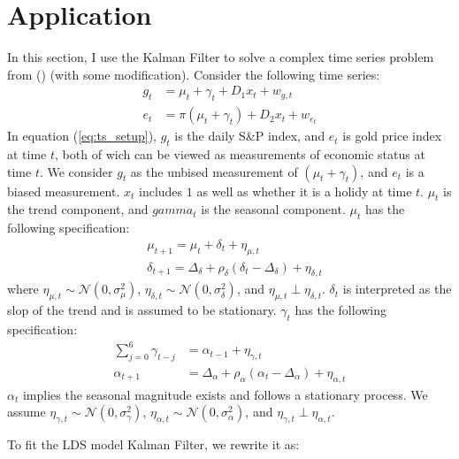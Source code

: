 \documentclass[12pt]{article}
\numberwithin{equation}{section}
\begin{document}
\section{Application} \label{sec:apply}
In this section, I use the Kalman Filter to solve a complex time series problem from (\cite{brodersen_etal_2015}) (with some modification). Consider the following time series: 
\begin{align}
    g_t &= \mu_t + \gamma_t + D_1x_t + w_{g,t} \label{eq:ts_setup} \\
    e_t &= \pi(\mu_t + \gamma_t) + D_2x_t + w_{e_t}
\end{align}
In equation (\ref{eq:ts_setup}), $g_t$ is the daily S\&P index, and $e_t$ is gold price index at time $t$, both of wich can be viewed as measurements of economic status at time $t$. We consider $g_t$ as the unbised measurement of $(\mu_t+\gamma_t)$, and $e_t$ is a biased measurement. $x_t$ includes $1$ as well as whether it is a holidy at time $t$. $\mu_t$ is the trend component, and $gamma_t$ is the seasonal component. $\mu_t$ has the following specification:
\begin{align}
    &\mu_{t+1} = \mu_{t} + \delta_t + \eta_{\mu,t} \\
    &\delta_{t+1} = \Delta_{\delta} + \rho_{\delta}(\delta_t - \Delta_{\delta}) + \eta_{\delta,t} 
\end{align}
where $\eta_{\mu,t}\sim\mathcal{N}(0,\sigma_{\mu}^2)$, $\eta_{\delta,t}\sim\mathcal{N}(0,\sigma_{\delta}^2)$, and $\eta_{\mu,t} \perp \eta_{\delta,t}$. $\delta_t$ is interpreted as the slop of the trend and is assumed to be stationary. $\gamma_t$ has the following specification:
\begin{align}
    \sum_{j=0}^6\gamma_{t-j} &= \alpha_{t-1} + \eta_{\gamma,t} \\
    \alpha_{t+1} &= \Delta_{\alpha} + \rho_{\alpha}(\alpha_t-\Delta_{\alpha}) + \eta_{\alpha,t}
\end{align}
$\alpha_t$ implies the seasonal magnitude exists and follows a stationary process. We assume $\eta_{\gamma,t}\sim\mathcal{N}(0,\sigma_{\gamma}^2)$, $\eta_{\alpha,t}\sim\mathcal{N}(0,\sigma_{\alpha}^2)$, and $\eta_{\gamma,t} \perp \eta_{\alpha,t}$.

To fit the LDS model Kalman Filter, we rewrite it as:
\end{document}
